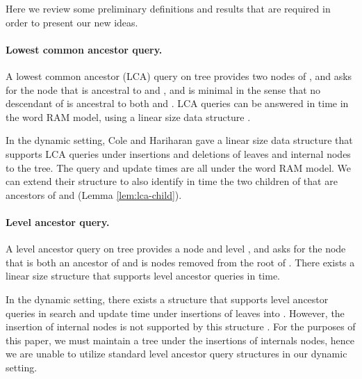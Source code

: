 \documentclass[11pt]{article}
\newcommand{\ignore}[1]{}
\begin{document}
Here we review some preliminary definitions and results that are
required in order to present our new ideas.

\paragraph{\bf Lowest common ancestor query.}
A lowest common ancestor (LCA) query on tree  provides two nodes  of ,
and asks for the node  that is ancestral to  and , and is minimal in the
sense that no descendant of  is ancestral to both  and .
LCA queries can be answered in  time in the word
RAM model, using a linear size data structure \cite{CoHa05}.

In the dynamic setting, Cole and Hariharan \cite{CoHa05} gave
a linear size data structure that supports LCA queries under insertions and
deletions of leaves and internal nodes to the tree. The query and update times are
all  under the word RAM model. We can extend their structure to also identify in
 time the two children of  that are ancestors of  and 
(Lemma \ref{lem:lca-child}).

\paragraph{\bf Level ancestor query.} A level ancestor query on tree 
provides a node  and level , and asks for the node  that is both an
ancestor of  and is  nodes removed from the root of . There exists a
linear size structure that supports level ancestor queries in  time.

In the dynamic setting, there exists a structure that supports level ancestor
queries in  search and update time under insertions of leaves into .
However, the insertion of internal nodes is not supported by this structure
\cite{AlHo00,KoLe07}. For the purposes of this paper, we must maintain a tree under the
insertions of internals nodes, hence we are unable to utilize standard level
ancestor query structures in our dynamic setting.

\ignore{
\paragraph{\bf Membership query.}
Given a set of numbers , there exists a linear data structure that
preprocesses the data in linear time, and can determine in  time
whether a given number  is a member of the set ~\cite{FrKoSz84}.
For our purposes, we will not require a dynamic version of this structure.

\paragraph{Predecessor query.}
The predecessor query problem is defined as follows: Given a set of
numbers  of size  over a universe  of size ,
preprocess  so that given a query number , the largest number
in  less than  can be efficiently computed. There exists a linear
space data structure that can be constructed in  time and
which answers predecessor queries in time  in the word RAM
model \cite{}.

For our purposes, we will not require a dynamic version of this structure.
}
\end{document}
